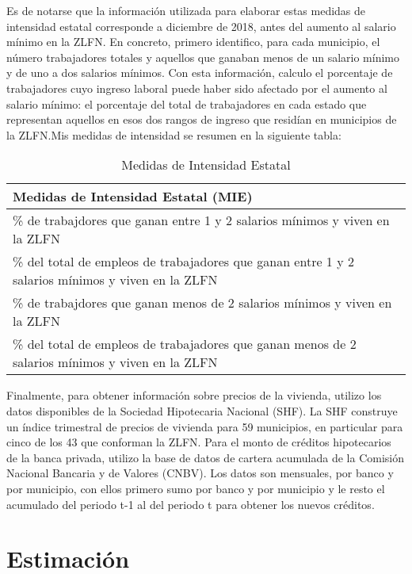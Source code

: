 	Es de notarse que la información utilizada para elaborar estas medidas de intensidad estatal corresponde a diciembre de 2018, antes del aumento al salario mínimo en la ZLFN. En concreto, primero identifico, para cada municipio, el número trabajadores totales y aquellos que ganaban menos de un salario mínimo y de uno a dos salarios mínimos. Con esta información, calculo el porcentaje de trabajadores cuyo ingreso laboral puede haber sido afectado por el aumento al salario mínimo: el porcentaje del total de trabajadores en cada estado que representan aquellos en esos dos rangos de ingreso que residían en municipios de la ZLFN.Mis medidas de intensidad se resumen en la siguiente tabla:


\begin{table}[h]
\caption{Medidas de Intensidad Estatal}
\label{tab:1}
\begin{adjustbox}{max width=\textwidth}
\begin{tabular}{l}
\hline
Medidas de Intensidad Estatal (MIE)                                                \\ \hline
\% de trabajdores que ganan entre 1 y 2 salarios mínimos y viven en la ZLFN                 \\
\% del total de empleos de trabajadores que ganan entre 1 y 2 salarios mínimos y viven en la ZLFN         \\
\% de trabajdores que ganan menos de 2 salarios mínimos y viven en la ZLFN                 \\
\% del total de empleos de trabajadores que ganan menos de 2 salarios mínimos y viven en la ZLFN         \\ \hline
\end{tabular}
\end{adjustbox}
\end{table}

Finalmente, para obtener información sobre precios de la vivienda, utilizo los datos disponibles de la Sociedad Hipotecaria Nacional (SHF). La SHF construye un índice trimestral de precios de vivienda para 59 municipios, en particular para cinco de los 43 que conforman la ZLFN. Para el monto de créditos hipotecarios de la banca privada, utilizo la base de datos de cartera acumulada de la Comisión Nacional Bancaria y de Valores (CNBV). Los datos son mensuales, por banco y por municipio, con ellos primero sumo por banco y por municipio y le resto el acumulado del periodo t-1 al del periodo t para obtener los nuevos créditos. 

\section{Estimación}

